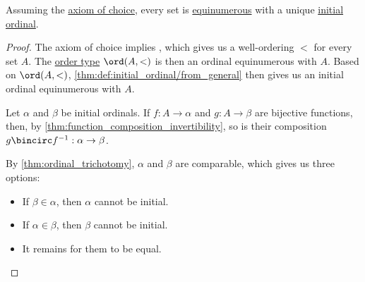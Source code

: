 \begin{proposition}\label{thm:initial_ordinal_existence}
  Assuming the \hyperref[def:zfc/choice]{axiom of choice}, every set is \hyperref[def:equinumerosity]{equinumerous} with a unique \hyperref[def:initial_ordinal]{initial ordinal}.
\end{proposition}
\begin{proof}
  \ExistenceSubProof The axiom of choice implies , which gives us a well-ordering \( {<} \) for every set \( A \). The \hyperref[def:well_ordered_order_type]{order type} \( \ord(A, <) \) is then an ordinal equinumerous with \( A \). Based on \( \ord(A, <) \), \cref{thm:def:initial_ordinal/from_general} then gives us an initial ordinal equinumerous with \( A \).

  \UniquenessSubProof Let \( \alpha \) and \( \beta \) be initial ordinals. If \( f: A \to \alpha \) and \( g: A \to \beta \) are bijective functions, then, by \cref{thm:function_composition_invertibility}, so is their composition \( g \bincirc f^{-1}: \alpha \to \beta \).

  By \cref{thm:ordinal_trichotomy}, \( \alpha \) and \( \beta \) are comparable, which gives us three options:
  \begin{itemize}
    \item If \( \beta \in \alpha \), then \( \alpha \) cannot be initial.
    \item If \( \alpha \in \beta \), then \( \beta \) cannot be initial.
    \item It remains for them to be equal.
  \end{itemize}
\end{proof}

